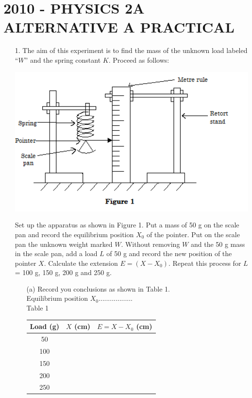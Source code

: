 \section{2010 - PHYSICS 2A ALTERNATIVE A PRACTICAL}

\begin{enumerate}
\item[1.] The aim of this experiment is to find the mass of the unknown load labeled ``$W$'' and the spring constant $K$. Proceed as follows:

\begin{center}
\includegraphics[width=14cm]{./img/2010-1-alt.png}
\end{center}

Set up the apparatus as shown in Figure 1. Put a mass of 50 g on the scale pan and record the equilibrium position $X_0$ of the pointer. Put on the scale pan the unknown weight marked $W$. Without removing $W$ and the 50 g mass in the scale pan, add a load $L$ of 50 g and record the new position of the pointer $X$. Calculate the extension $E = (X - X_0)$. Repeat this process for $L$ = 100 g, 150 g, 200 g and 250 g.
\begin{enumerate}
\item[(a)] Record you conclusions as shown in Table 1.\\[10pt]

Equilibrium position $X_0$..................\\[10pt]

Table 1\\[10pt]

\begin{tabular}{|p{3cm}|p{3cm}|p{3cm}|} \hline
\multicolumn{1}{|c|}{Load (g)} & \multicolumn{1}{c|}{$X$ (cm)} & \multicolumn{1}{c|}{$E = X - X_0$ (cm)} \\ \hline
\multicolumn{1}{|c|}{50} & & \\ \hline
\multicolumn{1}{|c|}{100} & & \\ \hline
\multicolumn{1}{|c|}{150} & & \\ \hline
\multicolumn{1}{|c|}{200} & & \\ \hline
\multicolumn{1}{|c|}{250} & & \\ \hline
\end{tabular}\\[10pt]


\end{enumerate}
\end{enumerate}
